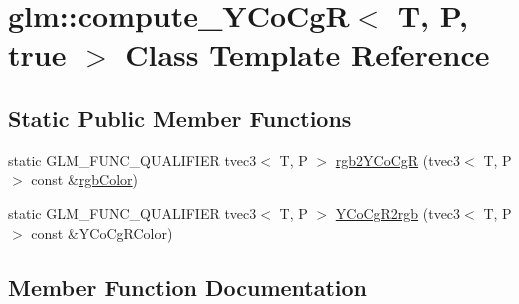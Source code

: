 \hypertarget{classglm_1_1compute___y_co_cg_r_3_01_t_00_01_p_00_01true_01_4}{}\section{glm\+:\+:compute\+\_\+\+Y\+Co\+Cg\+R$<$ T, P, true $>$ Class Template Reference}
\label{classglm_1_1compute___y_co_cg_r_3_01_t_00_01_p_00_01true_01_4}
\subsection*{Static Public Member Functions}
\begin{DoxyCompactItemize}
\item 
static G\+L\+M\+\_\+\+F\+U\+N\+C\+\_\+\+Q\+U\+A\+L\+I\+F\+I\+E\+R tvec3$<$ T, P $>$ \hyperlink{classglm_1_1compute___y_co_cg_r_3_01_t_00_01_p_00_01true_01_4_a82803505194346c9a8d9d17d770a8c45}{rgb2\+Y\+Co\+Cg\+R} (tvec3$<$ T, P $>$ const \&\hyperlink{group__gtx__color__space_ga36b0619e31daf57bc4a54dac2dcf34b7}{rgb\+Color})
\item 
static G\+L\+M\+\_\+\+F\+U\+N\+C\+\_\+\+Q\+U\+A\+L\+I\+F\+I\+E\+R tvec3$<$ T, P $>$ \hyperlink{classglm_1_1compute___y_co_cg_r_3_01_t_00_01_p_00_01true_01_4_a06da2d71b6b47d04e9579eef10022cbb}{Y\+Co\+Cg\+R2rgb} (tvec3$<$ T, P $>$ const \&Y\+Co\+Cg\+R\+Color)
\end{DoxyCompactItemize}


\subsection{Member Function Documentation}
\hypertarget{classglm_1_1compute___y_co_cg_r_3_01_t_00_01_p_00_01true_01_4_a82803505194346c9a8d9d17d770a8c45}{}
